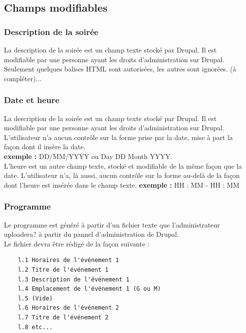 \documentclass[11pt]{report}
\begin{document}
\vspace{0.5cm}

\subsection{Champs modifiables}

\subsubsection{Description de la soirée}

La description de la soirée est un champ texte stocké par Drupal. Il est
modifiable par une personne ayant les droits d'administration sur Drupal.
Seulement quelques balises HTML sont autorisées, les autres sont ignorées.
(à compléter)...

\subsubsection{Date et heure}

La description de la soirée est un champ texte stocké par Drupal. Il est
modifiable par une personne ayant les droits d'administration sur Drupal.
L'utilisateur n'a aucun contrôle sur la forme prise par la date, mise à part la
façon dont il insère la date. \\
\textbf{exemple :} DD/MM/YYYY ou Day DD Month YYYY. \\

L'heure est un autre champ texte, stocké et modifiable de la même façon que la
date.
L'utilisateur n'a, là aussi, aucun contrôle sur la forme au-delà de la façon
dont l'heure est insérée dans le champ texte.
\textbf{exemple :} HH : MM - HH : MM \\

\subsubsection{Programme}

Le programme est généré à partir d'un fichier texte que l'administrateur
uploadera? à partir du pannel d'administration de Drupal. \\
Le fichier devra être rédigé de la façon suivante :
\begin{verbatim}
	l.1 Horaires de l'événement 1
	l.2 Titre de l'événement 1
	l.3 Description de l'événement 1
	l.4 Emplacement de l'événement 1 (G ou M)
	l.5 (Vide)
	l.6 Horaires de l'événement 2
	l.7 Titre de l'événement 2
	l.8 etc...
\end{verbatim}
\end{document}
